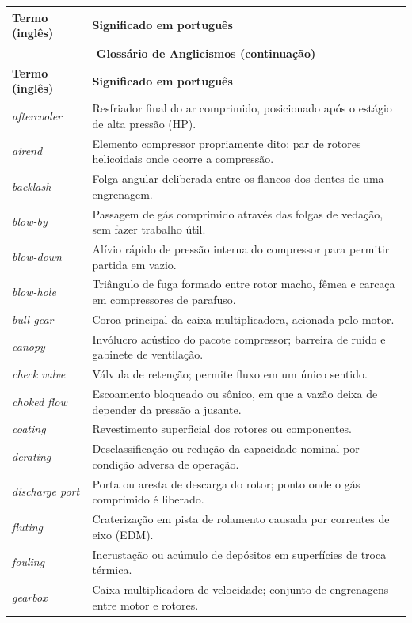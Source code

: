 \documentclass[12pt,a4paper]{article}
\numberwithin{equation}{section}
\numberwithin{table}{section}
\numberwithin{figure}{section}
\begin{document}
\begin{longtable}{p{4.0cm} p{10.0cm}}
\toprule
\textbf{Termo (inglês)} & \textbf{Significado em português} \\
\midrule
\endfirsthead
\multicolumn{2}{c}{{\bfseries Glossário de Anglicismos (continuação)}} \\
\toprule
\textbf{Termo (inglês)} & \textbf{Significado em português} \\
\midrule
\endhead
\bottomrule
\endfoot
\textit{aftercooler} & Resfriador final do ar comprimido, posicionado após o estágio de alta pressão (HP). \\
\textit{airend} & Elemento compressor propriamente dito; par de rotores helicoidais onde ocorre a compressão. \\
\textit{backlash} & Folga angular deliberada entre os flancos dos dentes de uma engrenagem. \\
\textit{blow-by} & Passagem de gás comprimido através das folgas de vedação, sem fazer trabalho útil. \\
\textit{blow-down} & Alívio rápido de pressão interna do compressor para permitir partida em vazio. \\
\textit{blow-hole} & Triângulo de fuga formado entre rotor macho, fêmea e carcaça em compressores de parafuso. \\
\textit{bull gear} & Coroa principal da caixa multiplicadora, acionada pelo motor. \\
\textit{canopy} & Invólucro acústico do pacote compressor; barreira de ruído e gabinete de ventilação. \\
\textit{check valve} & Válvula de retenção; permite fluxo em um único sentido. \\
\textit{choked flow} & Escoamento bloqueado ou sônico, em que a vazão deixa de depender da pressão a jusante. \\
\textit{coating} & Revestimento superficial dos rotores ou componentes. \\
\textit{derating} & Desclassificação ou redução da capacidade nominal por condição adversa de operação. \\
\textit{discharge port} & Porta ou aresta de descarga do rotor; ponto onde o gás comprimido é liberado. \\
\textit{fluting} & Craterização em pista de rolamento causada por correntes de eixo (EDM). \\
\textit{fouling} & Incrustação ou acúmulo de depósitos em superfícies de troca térmica. \\
\textit{gearbox} & Caixa multiplicadora de velocidade; conjunto de engrenagens entre motor e rotores. \\

\end{longtable}
\end{document}
